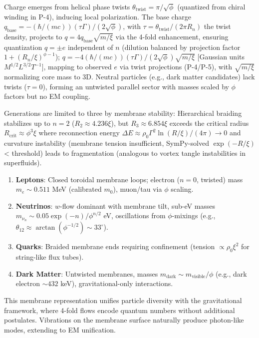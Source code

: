 Charge emerges from helical phase twists $\theta_{\text{twist}} = \pi / \sqrt{\phi}$ (quantized from chiral winding in P-4), inducing local polarization. The base charge $q_{\text{base}} = - (\hbar / (m c)) (\tau \Gamma) / (2 \sqrt{\phi})$, with $\tau = \theta_{\text{twist}} / (2 \pi R_n)$ the twist density, projects to $q = 4 q_{\text{base}} \sqrt{m / \xi}$ via the 4-fold enhancement, ensuring quantization $q = \pm e$ independent of $n$ (dilution balanced by projection factor $1 + (R_n / \xi)^{\phi - 1}$); $q = -4 (\hbar / (m c)) (\tau \Gamma) / (2 \sqrt{\phi}) \sqrt{m / \xi}$ [Gaussian units $M^{1/2} L^{3/2} T^{-1}$], mapping to observed $e$ via twist projections (P-4/P-5), with $\sqrt{m / \xi}$ normalizing core mass to 3D. Neutral particles (e.g., dark matter candidates) lack twists ($\tau = 0$), forming an untwisted parallel sector with masses scaled by $\phi$ factors but no EM coupling.

Generations are limited to three by membrane stability: Hierarchical braiding stabilizes up to $n=2$ ($R_2 \approx 4.236 \xi$), but $R_3 \approx 6.854 \xi$ exceeds the critical radius $R_{\text{crit}} \approx \phi^3 \xi$ where reconnection energy $\Delta E \approx \rho_0 \Gamma^2 \ln(R / \xi) / (4\pi) \to 0$ and curvature instability (membrane tension insufficient, SymPy-solved $\exp(-R/\xi)$ < threshold) leads to fragmentation (analogous to vortex tangle instabilities in superfluids).

\begin{enumerate}
\item \textbf{Leptons}: Closed toroidal membrane loops; electron ($n=0$, twisted) mass $m_e \sim 0.511$ MeV (calibrated $m_0$), muon/tau via $\phi$ scaling.
\item \textbf{Neutrinos}: $w$-flow dominant with membrane tilt, sub-eV masses $m_{\nu_n} \sim 0.05 \exp(-n) / \phi^{n/2}$ eV, oscillations from $\phi$-mixings (e.g., $\theta_{12} \approx \arctan(\phi^{-1/2}) \sim 33^\circ$).
\item \textbf{Quarks}: Braided membrane ends requiring confinement (tension $\propto \rho_0 \xi^2$ for string-like flux tubes).
\item \textbf{Dark Matter}: Untwisted membranes, masses $m_{\text{dark}} \sim m_{\text{visible}} / \phi$ (e.g., dark electron $\sim 432$ keV), gravitational-only interactions.
\end{enumerate}

This membrane representation unifies particle diversity with the gravitational framework, where 4-fold flows encode quantum numbers without additional postulates. Vibrations on the membrane surface naturally produce photon-like modes, extending to EM unification.

